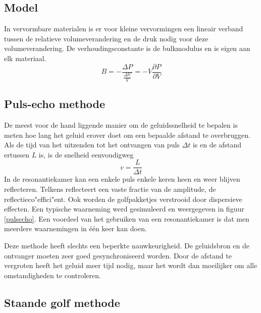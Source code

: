 \subsection{Model}

In vervormbare materialen is er voor kleine vervormingen een lineair verband 
tussen de relatieve volumeverandering en de druk nodig voor deze 
volumeverandering. De verhoudingsconstante is de bulkmodulus en is eigen aan 
elk materiaal.
\begin{equation}
\label{bulkmod}
B = -\frac{\Delta P}{\frac{\Delta V}{V}} = - V \frac{\partial P}{\partial V}
\end{equation}



\subsection{Puls-echo methode}
De meest voor de hand liggende manier om de geluidssnelheid te bepalen is meten 
hoe lang het geluid erover doet om een bepaalde afstand te overbruggen. Als de 
tijd van het uitzenden tot het ontvangen van puls $\Delta t$ is en de afstand 
ertussen $L$ is, is de snelheid eenvoudigweg
$$
v = \frac{L}{\Delta t}
$$
In de resonantiekamer kan een enkele puls enkele keren heen en weer blijven 
reflecteren. Telkens reflecteert een vaste fractie van de amplitude, de 
reflectieco"effici"ent. Ook worden de golfpakketjes verstrooid door dispersieve 
effecten. Een typische waarneming werd gesimuleerd en weergegeven in figuur 
\ref{pulsecho}.  Een voordeel van het gebruiken van een resonantiekamer is dat
men meerdere waarnemingen in \'e\'en keer kan doen.


Deze methode heeft slechts een beperkte nauwkeurigheid.  De geluidsbron en de 
ontvanger moeten zeer goed gesynchroniseerd worden. Door de afstand te 
vergroten heeft het geluid meer tijd nodig, maar het wordt dan moeilijker om 
alle omstandigheden te controleren. 

\subsection{Staande golf methode}

